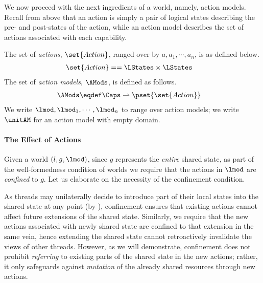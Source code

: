 We now proceed with the next ingredients of a \colosl world, namely, action models. Recall from above that an action is simply a pair of logical states describing the pre- and post-states of the action, while an action model describes the set of actions associated with each capability.
%
%
\begin{definition}
The set of \emph{actions}, $\set{Action}$, ranged over by $a, a_1, \cdots, a_n$, is as defined below.
%
\begin{align*}
  \set{Action} &== \LStates \times \LStates
  \vspace{-1ex}
\end{align*}
%
The set of \emph{action models}, $\AMods$, is defined as follows. 
%
\begin{align*}
	\AMods &\eqdef \Caps \rightharpoonup \pset{\set{Action}}
\end{align*}
%  
We write $\lmod, \lmod_1, \cdots, \lmod_n$ to range over action models; we write $\unitAM$ for an action model with empty domain.
\end{definition}
%
%
\paragraph{The Effect of Actions} 
Given a world $(l, g, \lmod)$, since $g$ represents the \emph{entire} shared state, as part of the well-formedness condition of worlds we require that the actions in $\lmod$ are \emph{confined} to $g$.  
Let us elaborate on the necessity of the confinement condition.

As threads may unilaterally decide to introduce part of their local states into the shared state at any point (by \extendRule), confinement ensures that existing actions cannot affect future extensions of the shared state. Similarly, we require that the new actions associated with newly shared state are confined to that extension in the same vein, hence extending the shared state cannot retroactively invalidate the views of other threads. However, as we will demonstrate, confinement does not prohibit \emph{referring} to existing parts of the shared state in the new actions; rather, it only safeguards against \emph{mutation} of the already shared resources through new actions.

